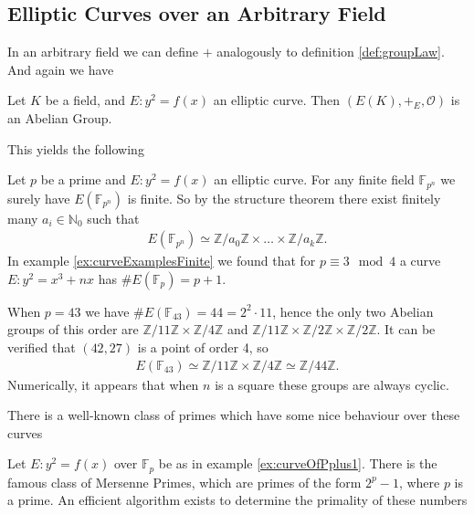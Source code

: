 \subsection{Elliptic Curves over an Arbitrary Field}%
\label{sub:elliptic_curves_over_an_arbitrary_field}
In an arbitrary field we can define $+$ analogously to definition \ref{def:groupLaw}.
And again we have
\begin{theorem}
  Let $K$ be a field, and $E: y^2 = f(x)$ an elliptic curve.
  Then $(E(K), +_E, \mathcal{O})$ is an Abelian Group.
\end{theorem}
This yields the following
\begin{example} \label{ex:curveOfPplus1}
  Let $p$ be a prime and $E: y^2 = f(x)$ an elliptic curve.
  For any finite field $\mathbb{F}_{p^n}$ we surely have
  $E(\mathbb{F}_{p^n})$ is finite. So by the structure theorem
  \cite[theorem 2.8]{sergeLangAlgebra}
  there exist finitely many $a_i \in \mathbb{N}_0$
  such that
  \begin{align*}
    E(\mathbb{F}_{p^{n}}) \simeq \mathbb{Z}/a_0\mathbb{Z} \times \dots \times \mathbb{Z}/a_{k}\mathbb{Z}.
  \end{align*}
  In example \ref{ex:curveExamplesFinite} we found that for
  $p \equiv 3 \mod 4$ a curve $E: y^2 = x^3 + nx$ has $\# E(\mathbb{F}_p) = p + 1$.

  When $p = 43$ we have $\#E(\mathbb{F}_{43}) = 44 = 2^2 \cdot 11$,
  hence the only two Abelian groups of this order are
  $\mathbb{Z}/11\mathbb{Z} \times \mathbb{Z}/4\mathbb{Z}$ and
  $\mathbb{Z}/11\mathbb{Z} \times \mathbb{Z}/2\mathbb{Z} \times \mathbb{Z}/2\mathbb{Z}$.
  It can be verified that $(42, 27)$ is a point of order 4, so
  \begin{align*}
    E(\mathbb{F}_{43}) \simeq \mathbb{Z}/11\mathbb{Z} \times \mathbb{Z}/4\mathbb{Z} \simeq \mathbb{Z}/44\mathbb{Z}.
  \end{align*}
  Numerically, it appears that when $n$ is a square these groups
  are always cyclic.
\end{example}
There is a well-known class of primes which have some nice behaviour over
these curves
\begin{example} \label{ex:mersenneCurve}
  Let $E: y^2 = f(x)$ over $\mathbb{F}_{p}$ be as in example \ref{ex:curveOfPplus1}.
  There is the famous class of Mersenne Primes, which are primes of
  the form $2^p - 1$, where $p$ is a prime. An efficient
  algorithm exists to determine the primality of these numbers
  \cite{bruceLLTest}
\end{example}

